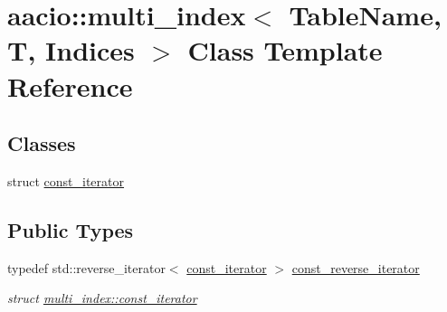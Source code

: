 \hypertarget{classaacio_1_1multi__index}{}\section{aacio\+:\+:multi\+\_\+index$<$ Table\+Name, T, Indices $>$ Class Template Reference}
\label{classaacio_1_1multi__index}
\subsection*{Classes}
\begin{DoxyCompactItemize}
\item 
struct \mbox{\hyperlink{structaacio_1_1multi__index_1_1const__iterator}{const\+\_\+iterator}}
\end{DoxyCompactItemize}
\subsection*{Public Types}
\begin{DoxyCompactItemize}
\item 
\mbox{\label{classaacio_1_1multi__index_a83b6d3fb20da0e35aa5e05cf02aabcdd}} 
typedef std\+::reverse\+\_\+iterator$<$ \mbox{\hyperlink{structaacio_1_1multi__index_1_1const__iterator}{const\+\_\+iterator}} $>$ \mbox{\hyperlink{classaacio_1_1multi__index_a83b6d3fb20da0e35aa5e05cf02aabcdd}{const\+\_\+reverse\+\_\+iterator}}
\begin{DoxyCompactList}\small\item\em struct \mbox{\hyperlink{structaacio_1_1multi__index_1_1const__iterator}{multi\+\_\+index\+::const\+\_\+iterator}} \end{DoxyCompactList}\end{DoxyCompactItemize}
